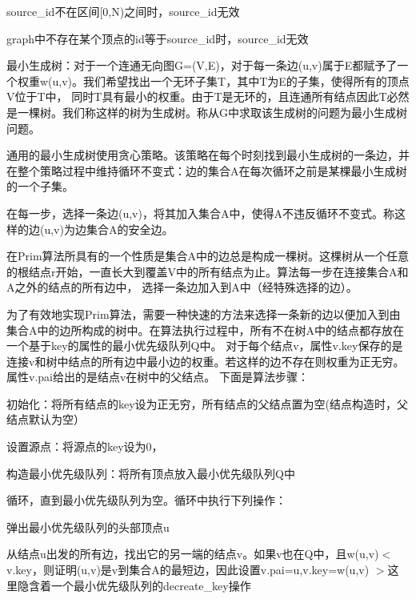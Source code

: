 \begin{DoxyItemize}
\item {\ttfamily source\+\_\+id}不在区间{\ttfamily \mbox{[}0,N)}之间时，{\ttfamily source\+\_\+id}无效
\item {\ttfamily graph}中不存在某个顶点的{\ttfamily id}等于{\ttfamily source\+\_\+id}时，{\ttfamily source\+\_\+id}无效
\end{DoxyItemize}

最小生成树：对于一个连通无向图\+G=(V,E)，对于每一条边(u,v)属于\+E都赋予了一个权重w(u,v)。我们希望找出一个无环子集\+T，其中\+T为\+E的子集，使得所有的顶点\+V位于\+T中， 同时\+T具有最小的权重。由于\+T是无环的，且连通所有结点因此\+T必然是一棵树。我们称这样的树为生成树。称从\+G中求取该生成树的问题为最小生成树问题。

通用的最小生成树使用贪心策略。该策略在每个时刻找到最小生成树的一条边，并在整个策略过程中维持循环不变式：边的集合\+A在每次循环之前是某棵最小生成树的一个子集。

在每一步，选择一条边(u,v)，将其加入集合\+A中，使得\+A不违反循环不变式。称这样的边(u,v)为边集合\+A的安全边。

在\+Prim算法所具有的一个性质是集合\+A中的边总是构成一棵树。这棵树从一个任意的根结点r开始，一直长大到覆盖\+V中的所有结点为止。算法每一步在连接集合\+A和\+A之外的结点的所有边中， 选择一条边加入到\+A中（经特殊选择的边）。

为了有效地实现\+Prim算法，需要一种快速的方法来选择一条新的边以便加入到由集合\+A中的边所构成的树中。在算法执行过程中，所有不在树\+A中的结点都存放在一个基于key的属性的最小优先级队列\+Q中。 对于每个结点v，属性v.\+key保存的是连接v和树中结点的所有边中最小边的权重。若这样的边不存在则权重为正无穷。属性v.\+pai给出的是结点v在树中的父结点。 下面是算法步骤：


\begin{DoxyItemize}
\item 初始化：将所有结点的key设为正无穷，所有结点的父结点置为空(结点构造时，父结点默认为空）
\item 设置源点：将源点的key设为0，
\item 构造最小优先级队列：将所有顶点放入最小优先级队列\+Q中
\item 循环，直到最小优先级队列为空。循环中执行下列操作：
\begin{DoxyItemize}
\item 弹出最小优先级队列的头部顶点u
\item 从结点u出发的所有边，找出它的另一端的结点v。如果v也在\+Q中，且w(u,v)$<$v.\+key，则证明(u,v)是v到集合\+A的最短边，因此设置v.\+pai=u,v.\+key=w(u,v) $>$这里隐含着一个最小优先级队列的decreate\+\_\+key操作
\end{DoxyItemize}
\end{DoxyItemize}

